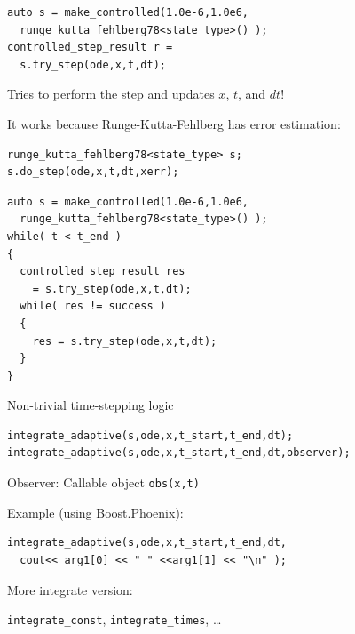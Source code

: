 \begin{frame}[fragile]
 
 
 \vspace{2ex}

 \begin{lstlisting}
auto s = make_controlled(1.0e-6,1.0e6,
  runge_kutta_fehlberg78<state_type>() );
controlled_step_result r = 
  s.try_step(ode,x,t,dt);
 \end{lstlisting}

 Tries to perform the step and updates $x$, $t$, and $dt$!

 \vspace{4ex}

 It works because Runge-Kutta-Fehlberg has error estimation:

 \begin{lstlisting}
runge_kutta_fehlberg78<state_type> s;
s.do_step(ode,x,t,dt,xerr);
 \end{lstlisting}


\end{frame}


\begin{frame}[fragile]


\vspace{2ex}

\begin{lstlisting}
auto s = make_controlled(1.0e-6,1.0e6,
  runge_kutta_fehlberg78<state_type>() );
while( t < t_end )
{
  controlled_step_result res
    = s.try_step(ode,x,t,dt);
  while( res != success )
  {
    res = s.try_step(ode,x,t,dt);
  }
}
\end{lstlisting}

\centerline{Non-trivial time-stepping logic}

\end{frame}


\begin{frame}[fragile]


\vspace{2ex}


\begin{lstlisting}
integrate_adaptive(s,ode,x,t_start,t_end,dt); 
integrate_adaptive(s,ode,x,t_start,t_end,dt,observer);
\end{lstlisting}

Observer: Callable object {\tt obs(x,t)}

\vspace{4ex}
Example (using Boost.Phoenix):
\begin{lstlisting}
integrate_adaptive(s,ode,x,t_start,t_end,dt,
  cout<< arg1[0] << " " <<arg1[1] << "\n" );
\end{lstlisting}

\vspace{2ex}
More integrate version:

{\tt integrate\_const}, {\tt integrate\_times}, \dots

\end{frame}



